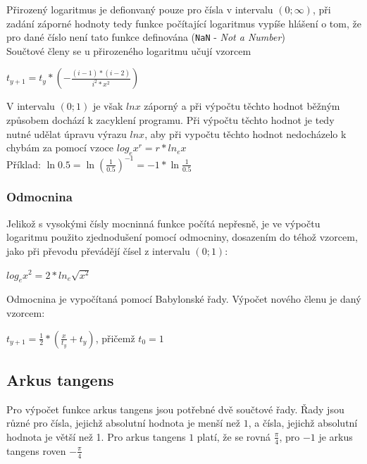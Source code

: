 \documentclass[12pt,a4paper,titlepage,final]{article}
\begin{document}
Přirozený logaritmus je defionvaný pouze pro čísla v intervalu $(0;\infty)$,
při zadání záporné hodnoty tedy funkce počítající logaritmus vypíše hlášení o
tom, že pro dané číslo není tato funkce definována 
(\texttt{NaN} - \textit{Not a Number})\\

Součtové členy se u přirozeného logaritmu učují vzorcem 
\begin{center}
$ {\displaystyle t_{y+1} = t_{y} * 
(- \frac{(i-1)*(i-2)}{i^{2}*x^{2}})}$\end{center}

V intervalu $(0;1)$ je však $lnx$ záporný a při výpočtu těchto hodnot běžným
způsobem dochází k zacyklení programu. Při výpočtu těchto hodnot je tedy nutné
udělat úpravu výrazu $lnx$, aby při vypočtu těchto hodnot nedocházelo k 
chybám za pomocí vzoce $log_e x^{r} = r*ln_{e}x$ \\

Příklad: $\ln 0.5 = \ln (\frac{1}{0.5})^{-1} = -1 * \ln \frac{1}{0.5}$

\subsubsection{Odmocnina}

Jelikož s vysokými čísly mocninná funkce počítá nepřesně, je ve výpočtu 
logaritmu použito zjednodušení pomocí odmocniny, dosazením do téhož vzorcem,
jako při převodu převádějí čísel z intervalu $(0;1)$:

\begin{center}
$ {\displaystyle log_e x^{2} = 2*ln_{e}\sqrt{x^{2}}}$\end{center}

Odmocnina je vypočítaná pomocí Babylonské řady. Výpočet nového členu je daný 
vzorcem: 
\begin{center}
$ {\displaystyle t_{y+1} = \frac{1}{2} * (\frac{x}{t_y}+t_y)}$, přičemž
$t_0 = 1$\end{center}

\subsection{Arkus tangens}

Pro výpočet funkce arkus tangens jsou potřebné dvě součtové řady. Řady jsou
různé pro čísla, jejichž absolutní hodnota je menší než $1$, a čísla, jejichž
absolutní hodnota je větší než 1. Pro arkus tangens $1$ platí, že se rovná
$\frac{\pi}{4}$, pro $-1$ je arkus tangens roven $-\frac{\pi}{4}$ \\
\end{document}
